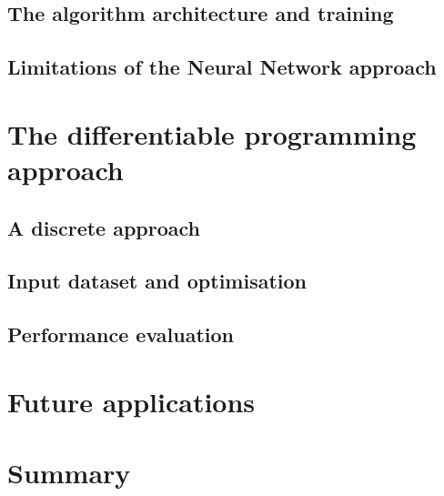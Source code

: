 
\subsection{The algorithm architecture and training} %
\subsection{Limitations of the Neural Network approach} %

\section{The differentiable programming approach} %
\subsection{A discrete approach} %
\subsection{Input dataset and optimisation} %
\subsection{Performance evaluation} %

\section{Future applications} %

\section*{Summary} %